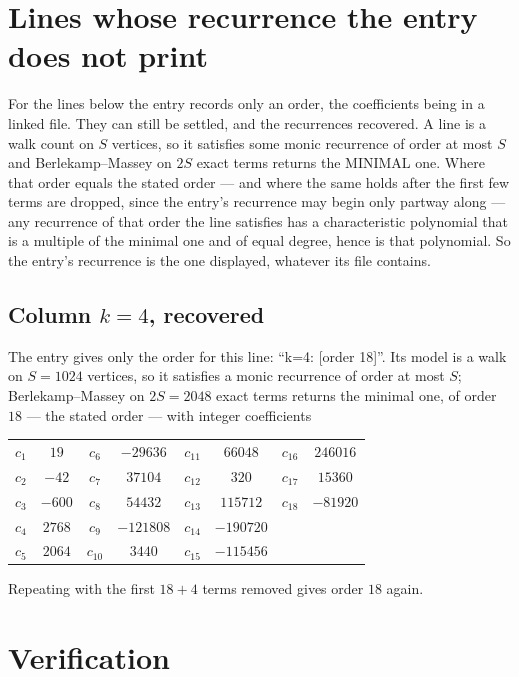 \documentclass[11pt,a4paper]{article}
\theoremstyle{plain}
\theoremstyle{definition}
\begin{document}
\section{Lines whose recurrence the entry does not print}

For the lines below the entry records only an order, the coefficients being in a linked file.
They can still be settled, and the recurrences recovered. A line is a walk count on $S$
vertices, so it satisfies some monic recurrence of order at most $S$ and Berlekamp--Massey on
$2S$ exact terms returns the MINIMAL one. Where that order equals the stated order --- and
where the same holds after the first few terms are dropped, since the entry's recurrence may
begin only partway along --- any recurrence of that order the line satisfies has a
characteristic polynomial that is a multiple of the minimal one and of equal degree, hence is
that polynomial. So the entry's recurrence is the one displayed, whatever its file contains.

\subsection*{Column $k=4$, recovered}
The entry gives only the order for this line: ``k=4: [order 18]''. Its model is a walk on
$S=1024$ vertices, so it satisfies a monic recurrence of order at most $S$;
Berlekamp--Massey on $2S=2048$ exact terms returns the minimal one, of order
$18$ --- the stated order --- with integer coefficients
\begin{center}\small\begin{tabular}{cccccccc}
$c_{1}$ & $19$ & $c_{6}$ & $-29636$ & $c_{11}$ & $66048$ & $c_{16}$ & $246016$ \\
$c_{2}$ & $-42$ & $c_{7}$ & $37104$ & $c_{12}$ & $320$ & $c_{17}$ & $15360$ \\
$c_{3}$ & $-600$ & $c_{8}$ & $54432$ & $c_{13}$ & $115712$ & $c_{18}$ & $-81920$ \\
$c_{4}$ & $2768$ & $c_{9}$ & $-121808$ & $c_{14}$ & $-190720$ &  &  \\
$c_{5}$ & $2064$ & $c_{10}$ & $3440$ & $c_{15}$ & $-115456$ &  &  \\
\end{tabular}\end{center}
Repeating with the first $18+4$ terms removed gives order $18$ again.

\section{Verification}
\end{document}
